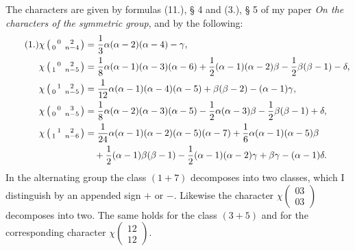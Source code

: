 \documentclass[11pt]{article}
\newcommand{\ch}[2]{\left(\begin{smallmatrix}#1\\#2\end{smallmatrix}\right)}
\begin{document}
The characters are given by formulas (11.), § 4 and (3.), § 5 of my paper \emph{On the characters of the symmetric group}, and by the following:
\begin{align}\tag{1.}
 \chi\ch{0\quad 2}{0\quad n-4}&=\frac13\alpha(\alpha-2)(\alpha-4)-\gamma,\\
 \chi\ch{0\quad 2}{1\quad n-5}&=\frac18\alpha(\alpha-1)(\alpha-3)(\alpha-6)+\frac12(\alpha-1)(\alpha-2)\beta-\frac12\beta(\beta-1)-\delta,\\
 \chi\ch{1\quad 2}{0\quad n-5}&=\frac1{12}\alpha(\alpha-1)(\alpha-4)(\alpha-5)+\beta(\beta-2)-(\alpha-1)\gamma,\\
 \chi\ch{0\quad 3}{0\quad n-5}&=\frac18\alpha(\alpha-2)(\alpha-3)(\alpha-5)-\frac12\alpha(\alpha-3)\beta-\frac12\beta(\beta-1)+\delta,\\
 \chi\ch{1\quad 2}{1\quad n-6}&=\frac1{24}\alpha(\alpha-1)(\alpha-2)(\alpha-5)(\alpha-7)+\frac16\alpha(\alpha-1)(\alpha-5)\beta\notag\\
 &\quad+\frac12(\alpha-1)\beta(\beta-1)-\frac12(\alpha-1)(\alpha-2)\gamma+\beta\gamma-(\alpha-1)\delta.
\end{align}
In the alternating group the class $(1+7)$ decomposes into two classes, which I distinguish by an appended sign $+$ or $-$. Likewise the character $\chi\ch{03}{03}$ decomposes into two. The same holds for the class $(3+5)$ and for the corresponding character $\chi\ch{12}{12}$.
\end{document}
